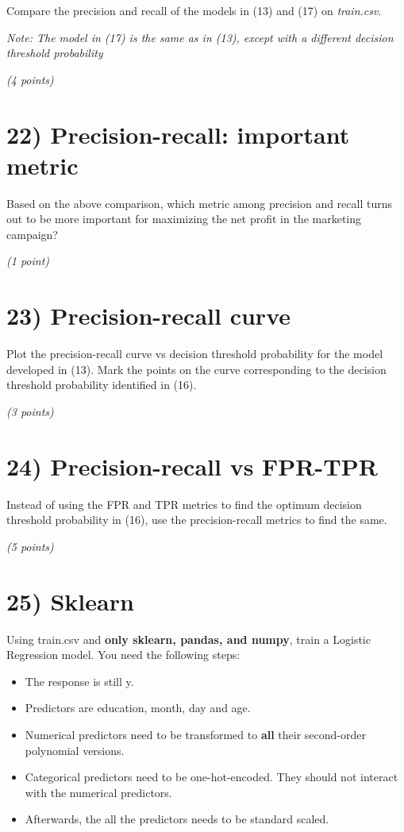 \documentclass[
  letterpaper,
  DIV=11,
  numbers=noendperiod]{scrreprt}
\providecommand{\tightlist}{%
  \setlength{\itemsep}{0pt}\setlength{\parskip}{0pt}}\usepackage{longtable,booktabs,array}
\begin{document}
Compare the precision and recall of the models in (13) and (17) on
\emph{train.csv}.

\emph{Note: The model in (17) is the same as in (13), except with a
different decision threshold probability}

\emph{(4 points)}

\section{22) Precision-recall: important
metric}\label{precision-recall-important-metric}

Based on the above comparison, which metric among precision and recall
turns out to be more important for maximizing the net profit in the
marketing campaign?

\emph{(1 point)}

\section{23) Precision-recall curve}\label{precision-recall-curve}

Plot the precision-recall curve vs decision threshold probability for
the model developed in (13). Mark the points on the curve corresponding
to the decision threshold probability identified in (16).

\emph{(3 points)}

\section{24) Precision-recall vs
FPR-TPR}\label{precision-recall-vs-fpr-tpr}

Instead of using the FPR and TPR metrics to find the optimum decision
threshold probability in (16), use the precision-recall metrics to find
the same.

\emph{(5 points)}

\section{25) Sklearn}\label{sklearn}

Using train.csv and \textbf{only sklearn, pandas, and numpy}, train a
Logistic Regression model. You need the following steps:

\begin{itemize}
\tightlist
\item
  The response is still y.
\item
  Predictors are education, month, day and age.
\item
  Numerical predictors need to be transformed to \textbf{all} their
  second-order polynomial versions.
\item
  Categorical predictors need to be one-hot-encoded. They should not
  interact with the numerical predictors.
\item
  Afterwards, the all the predictors needs to be standard scaled.
\end{itemize}
\end{document}
